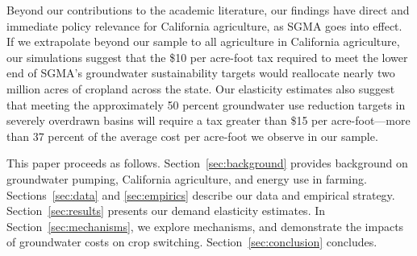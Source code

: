 Beyond our contributions to the academic  literature, our findings have direct and immediate policy relevance for California agriculture, as SGMA goes into effect. If we extrapolate beyond our sample to all agriculture in California agriculture, our simulations suggest that the \$10 per acre-foot tax required to meet the lower end of SGMA's groundwater sustainability targets would reallocate nearly two million acres of cropland across the state. Our elasticity estimates also suggest that meeting the approximately 50 percent groundwater use reduction targets in severely overdrawn basins will require a tax greater than \$15 per acre-foot---more than 37 percent of the average cost per acre-foot we observe in our sample. 

This paper proceeds as follows. Section~\ref{sec:background} provides background on groundwater pumping, California agriculture, and energy use in farming. Sections~\ref{sec:data} and \ref{sec:empirics} describe our data and empirical strategy. Section~\ref{sec:results} presents our demand elasticity estimates. In Section~\ref{sec:mechanisms}, we explore mechanisms, and demonstrate the impacts of groundwater costs on crop switching.
Section~\ref{sec:conclusion} concludes. 
